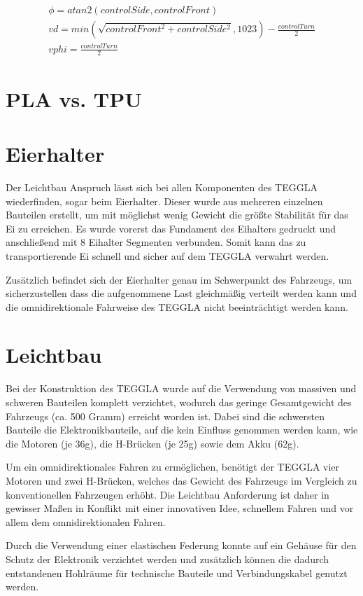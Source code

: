 \begin{align}
	\phi = atan2(controlSide, controlFront)\\
	vd = min(\sqrt{controlFront^2 + controlSide^2}, 1023) - \frac{controlTurn}{2}\\
	vphi = \frac{controlTurn}{2}
\end{align}


\section{PLA vs. TPU}

\section{Eierhalter}					
Der Leichtbau Anspruch lässt sich bei allen Komponenten des TEGGLA wiederfinden, sogar beim Eierhalter. 
Dieser wurde aus mehreren einzelnen Bauteilen erstellt, um mit möglichst wenig Gewicht die größte Stabilität für das Ei zu erreichen. 
Es wurde vorerst das Fundament des Eihalters gedruckt und anschließend mit 8 Eihalter Segmenten verbunden. 
Somit kann das zu transportierende Ei schnell und sicher auf dem TEGGLA verwahrt werden. 

Zusätzlich befindet sich der Eierhalter genau im Schwerpunkt des Fahrzeugs, um sicherzustellen dass die aufgenommene Last gleichmäßig verteilt werden kann und die omnidirektionale Fahrweise des TEGGLA nicht beeinträchtigt werden kann.



\section{Leichtbau}	

Bei der Konstruktion des TEGGLA wurde auf die Verwendung von massiven und schweren Bauteilen komplett verzichtet, wodurch das geringe Gesamtgewicht des Fahrzeugs (ca. 500 Gramm) erreicht worden ist. 
Dabei sind die schwersten Bauteile die Elektronikbauteile, auf die kein Einfluss genommen werden kann, wie die Motoren (je 36g), die H-Brücken (je 25g) sowie dem Akku (62g). 

Um ein omnidirektionales Fahren zu ermöglichen, benötigt der TEGGLA vier Motoren und zwei H-Brücken, welches das Gewicht des Fahrzeugs im Vergleich zu konventionellen Fahrzeugen erhöht. 
Die Leichtbau Anforderung ist daher in gewisser Maßen in Konflikt mit einer innovativen Idee, schnellem Fahren und vor allem dem omnidirektionalen Fahren. 

Durch die Verwendung einer elastischen Federung konnte auf ein Gehäuse für den Schutz der Elektronik verzichtet werden und zusätzlich können die dadurch entstandenen Hohlräume für technische Bauteile und Verbindungskabel genutzt werden.    
